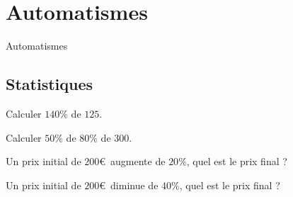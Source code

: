\documentclass[14pt]{beamer}
\begin{document}
\section{Automatismes}

\begin{frame}

\centering \huge
Automatismes

\end{frame}

\subsection{Statistiques}

\begin{frame}{1}
	\centering
	Calculer $140\%$ de $125$.
\end{frame}

\begin{frame}{2}
	\centering
	Calculer $50\%$ de $80\%$ de $300$.
\end{frame}

\begin{frame}{3}
	\centering
	Un prix initial de $200$\euro\, augmente de $20\%$, quel est le prix final ?
\end{frame}

\begin{frame}{4}
	\centering
	Un prix initial de $200$\euro\, diminue de $40\%$, quel est le prix final ?
\end{frame}
\end{document}
